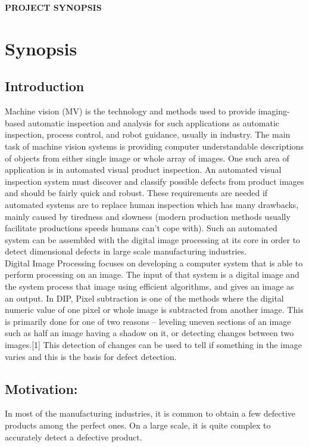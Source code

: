 \documentclass[14pt]{extarticle}
\begin{document}
\begin{Large}
\begin{center}
\textbf{PROJECT SYNOPSIS}
\end{center}
\end{Large}

\section{Synopsis}
\subsection{Introduction}
{\quad}Machine vision (MV) is the technology and methods used to provide imaging-based automatic inspection and analysis for such applications as automatic inspection, process control, and robot guidance, usually in industry. The main task of machine vision systems is providing computer understandable descriptions of objects from either single image or whole array of images. One such area of application  is in automated visual product inspection. An automated visual inspection system must discover and classify possible defects from product images and should be fairly quick and robust. These requirements are needed if automated systems are to replace human inspection which has many drawbacks, mainly caused by tiredness and slowness (modern production methods usually facilitate productions speeds humans can't cope with). Such an automated system can be assembled with the digital image processing at its core in order to detect dimensional  defects in large scale manufacturing industries.\\

{\quad}Digital Image Processing focuses on developing a computer system that is able to perform processing on an image. The input of that system is a digital image and the system process that image using efficient algorithms, and gives an image as an output. In DIP,  Pixel subtraction is one of the methods where the digital numeric value of one pixel or whole image is subtracted from another image. This is primarily done for one of two reasons – leveling uneven sections of an image such as half an image having a shadow on it, or detecting changes between two images.[1] This detection of changes can be used to tell if something  in the image varies and this is the basis for defect detection.



\subsection{Motivation:}
{\quad}In most of the manufacturing industries, it is common to obtain a few defective products among the perfect ones. On a large scale, it is quite complex to accurately detect a defective product.\\
\end{document}
